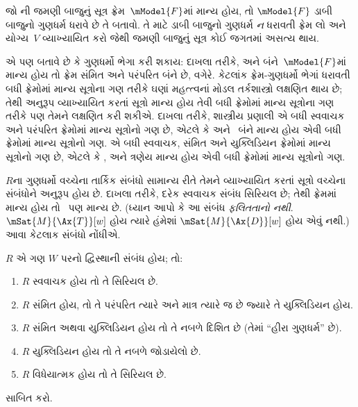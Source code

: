 \begin{prob}
જો ની જમણી
બાજુનું સૂત્ર ફ્રેમ~$\mModel{F}$માં માન્ય હોય,
તો $\mModel{F}$ ડાબી બાજુનો ગુણધર્મ ધરાવે છે તે
બતાવો. તે માટે ડાબી બાજુનો ગુણધર્મ \emph{ન} ધરાવતી
ફ્રેમ લો અને યોગ્ય~$V$ વ્યાખ્યાયિત કરો જેથી
જમણી બાજુનું સૂત્ર કોઈ જગતમાં અસત્ય થાય.
\end{prob}

 એ પણ બતાવે છે કે
ગુણધર્મો ભેગા કરી શકાય: દાખલા તરીકે, 
અને  બંને~$\mModel{F}$માં માન્ય હોય તો ફ્રેમ
સંમિત અને પરંપરિત બંને છે, વગેરે. કેટલાંક
ફ્રેમ-ગુણધર્મો ભેગાં ધરાવતી બધી ફ્રેમોમાં માન્ય
સૂત્રોના ગણ તરીકે ઘણાં મહત્ત્વનાં મોડલ
તર્કશાસ્ત્રો લક્ષણિત થાય છે; તેથી અનુરૂપ વ્યાખ્યાયિત
કરતાં સૂત્રો માન્ય હોય તેવી બધી ફ્રેમોમાં
માન્ય સૂત્રોના ગણ તરીકે પણ તેમને લક્ષણિત
કરી શકીએ. દાખલા તરીકે, શાસ્ત્રીય પ્રણાલી
 એ બધી સ્વવાચક અને પરંપરિત ફ્રેમોમાં
માન્ય સૂત્રોનો ગણ છે, એટલે કે 
અને~ બંને માન્ય હોય એવી બધી ફ્રેમોમાં
માન્ય સૂત્રોનો ગણ.  એ બધી સ્વવાચક,
સંમિત અને યુક્લિડિયન ફ્રેમોમાં માન્ય સૂત્રોનો ગણ છે,
એટલે કે ,  અને  ત્રણેય
માન્ય હોય એવી બધી ફ્રેમોમાં માન્ય સૂત્રોનો ગણ.

$R$ના ગુણધર્મો વચ્ચેના તાર્કિક સંબંધો સામાન્ય રીતે
તેમને વ્યાખ્યાયિત કરતાં સૂત્રો વચ્ચેના સંબંધોને
અનુરૂપ હોય છે. દાખલા તરીકે, દરેક સ્વવાચક સંબંધ
સિરિયલ છે; તેથી ફ્રેમમાં  માન્ય હોય તો~
પણ માન્ય છે. (ધ્યાન આપો કે આ સંબંધ
\emph{ફલિતતાનો નથી}. $\mSat{M}{\Ax{T}}[w]$ હોય
ત્યારે હંમેશાં $\mSat{M}{\Ax{D}}[w]$ હોય એવું નથી.)
આવા કેટલાક સંબંધો નોંધીએ.

\begin{prop}
  $R$ એ ગણ $W$ પરનો દ્વિસ્થાની સંબંધ હોય; તો:
  \begin{enumerate}
  \item $R$ સ્વવાચક હોય તો તે સિરિયલ છે.
  \item $R$ સંમિત હોય, તો તે પરંપરિત ત્યારે અને માત્ર
    ત્યારે જ છે જ્યારે તે યુક્લિડિયન હોય.
  \item $R$ સંમિત અથવા યુક્લિડિયન હોય તો તે
    નબળે દિશિત છે (તેમાં ``હીરા ગુણધર્મ'' છે).
  \item $R$ યુક્લિડિયન હોય તો તે નબળે જોડાયેલો છે.
  \item $R$ વિધેયાત્મક હોય તો તે સિરિયલ છે.
  \end{enumerate}
\end{prop}

\begin{prob}
   સાબિત કરો.
\end{prob}
\endgroup

